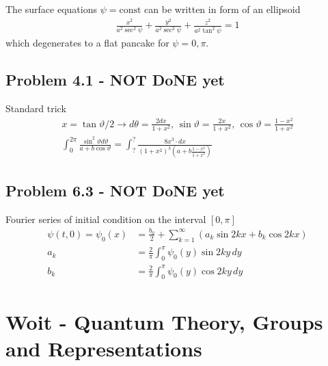 \documentclass[10pt,a4paper]{book}
\theoremstyle{definition}
\begin{document}
The surface equations $\psi=\text{const}$ can be written in form of an ellipsoid
\begin{align}
    \frac{x^2}{a^2\sec^2\psi}+\frac{y^2}{a^2\sec^2\psi}+\frac{z^2}{a^2\tan^2\psi}=1
\end{align}
which degenerates to a flat pancake for $\psi=0,\pi$.

\subsection{Problem 4.1 - NOT DoNE yet}
Standard trick
\begin{align}
    x=\tan\vartheta/2\rightarrow d\theta =\frac{2dx}{1+x^2},\,\sin\vartheta=\frac{2x}{1+x^2},\,\cos\vartheta=\frac{1-x^2}{1+x^2}\\
    \int_0^{2\pi}\frac{\sin^2\vartheta d\vartheta}{a+b\cos\vartheta}=\int_?^{?}\frac{8x^3\cdot dx}{(1+x^2)^3(a+b\frac{1-x^2}{1+x^2})}
\end{align}

\subsection{Problem 6.3 - NOT DoNE yet}
Fourier series of initial condition on the interval $[0,\pi]$
\begin{align}
\psi(t,0)=\psi_0(x)
&=\frac{b_0}{2}+\sum_{k=1}^\infty(a_k\sin 2kx+b_k\cos 2kx)\\
a_k
&=\frac{2}{\pi}\int_{0}^\pi\psi_0(y)\sin 2ky\,dy\\
b_k
&=\frac{2}{\pi}\int_{0}^\pi\psi_0(y)\cos 2ky\,dy
\end{align}


\section{{\sc Woit} - Quantum Theory, Groups and Representations}
\end{document}
